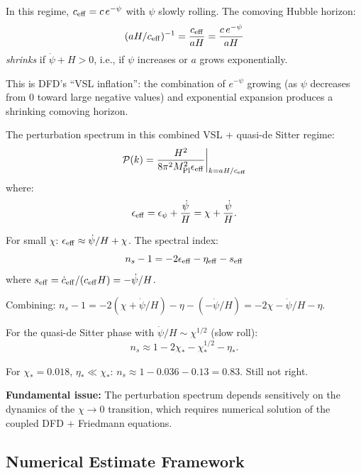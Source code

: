 \documentclass[11pt,a4paper]{article}
\begin{document}
In this regime, $c_{\rm eff} = c\,e^{-\psi}$ with $\psi$ slowly rolling. The comoving Hubble horizon:
\begin{equation}
(aH/c_{\rm eff})^{-1} = \frac{c_{\rm eff}}{aH} = \frac{c\,e^{-\psi}}{aH}
\end{equation}
\emph{shrinks} if $\dot\psi + H > 0$, i.e., if $\psi$ increases or $a$ grows exponentially.

This is DFD's ``VSL inflation'': the combination of $e^{-\psi}$ growing (as $\psi$ decreases from 0 toward large negative values) and exponential expansion produces a shrinking comoving horizon.

The perturbation spectrum in this combined VSL + quasi-de Sitter regime:
\begin{equation}
\mathcal{P}(k) = \frac{H^2}{8\pi^2 M_{\rm Pl}^2 \epsilon_{\rm eff}}\bigg|_{k = aH/c_{\rm eff}}
\end{equation}
where:
\begin{equation}
\epsilon_{\rm eff} = \epsilon_\psi + \frac{\dot\psi}{H} = \chi + \frac{\dot\psi}{H}.
\end{equation}

For small $\chi$: $\epsilon_{\rm eff} \approx \dot\psi/H + \chi$. The spectral index:
\begin{equation}
n_s - 1 = -2\epsilon_{\rm eff} - \eta_{\rm eff} - s_{\rm eff}
\end{equation}
where $s_{\rm eff} = \dot{c}_{\rm eff}/(c_{\rm eff}H) = -\dot\psi/H$.

Combining: $n_s - 1 = -2(\chi + \dot\psi/H) - \eta - (-\dot\psi/H) = -2\chi - \dot\psi/H - \eta$.

For the quasi-de Sitter phase with $\dot\psi/H \sim \chi^{1/2}$ (slow roll):
\begin{equation}
\boxed{n_s \approx 1 - 2\chi_* - \chi_*^{1/2} - \eta_*.}
\end{equation}

For $\chi_* = 0.018$, $\eta_* \ll \chi_*$: $n_s \approx 1 - 0.036 - 0.13 = 0.83$. Still not right.

\textbf{Fundamental issue:} The perturbation spectrum depends sensitively on the dynamics of the $\chi \to 0$ transition, which requires numerical solution of the coupled DFD + Friedmann equations.

\subsection{Numerical Estimate Framework}
\end{document}

